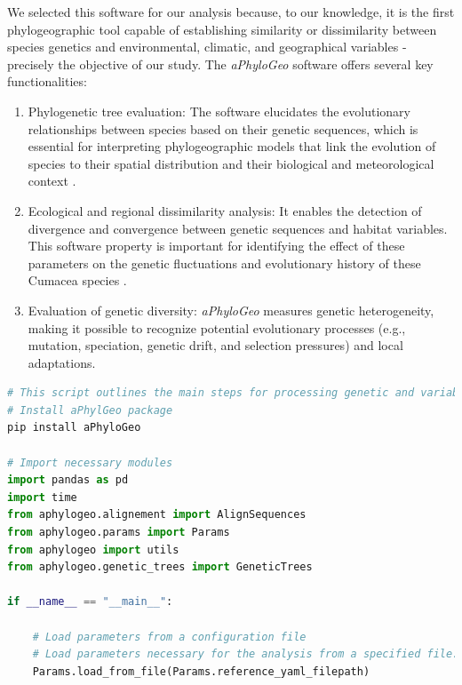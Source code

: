 {We selected this software for our analysis because, to our knowledge, it is the first phylogeographic tool capable of establishing similarity or dissimilarity between species genetics and environmental, climatic, and geographical variables \citep{koshkarov_phylogeography_2022} - precisely the objective of our study. The \textit{aPhyloGeo} software offers several key functionalities:

\begin{enumerate}[label=\arabic*.]
\item Phylogenetic tree evaluation: The software elucidates the evolutionary relationships between species based on their genetic sequences, which is essential for interpreting phylogeographic models that link the evolution of species to their spatial distribution and their biological and meteorological context \citep{koshkarov_phylogeography_2022}.
\item Ecological and regional dissimilarity analysis: It enables the detection of divergence and convergence between genetic sequences and habitat variables. This software property is important for identifying the effect of these parameters on the genetic fluctuations and evolutionary history of these Cumacea species \citep{koshkarov_phylogeography_2022}.
\item Evaluation of genetic diversity: \textit{aPhyloGeo} measures genetic heterogeneity, making it possible to recognize potential evolutionary processes (e.g., mutation, speciation, genetic drift, and selection pressures) and local adaptations.
\end{enumerate}

\begin{lstlisting}[label=lst:main,language=Python,caption=Main script for tutorial using the aPhyloGeo package.]
# This script outlines the main steps for processing genetic and variable data using the aPhyloGeo package.
# Install aPhylGeo package
pip install aPhyloGeo

# Import necessary modules
import pandas as pd
import time
from aphylogeo.alignement import AlignSequences
from aphylogeo.params import Params
from aphylogeo import utils
from aphylogeo.genetic_trees import GeneticTrees
    
if __name__ == "__main__":

    # Load parameters from a configuration file
    # Load parameters necessary for the analysis from a specified file.
    Params.load_from_file(Params.reference_yaml_filepath)


\end{lstlisting}}
